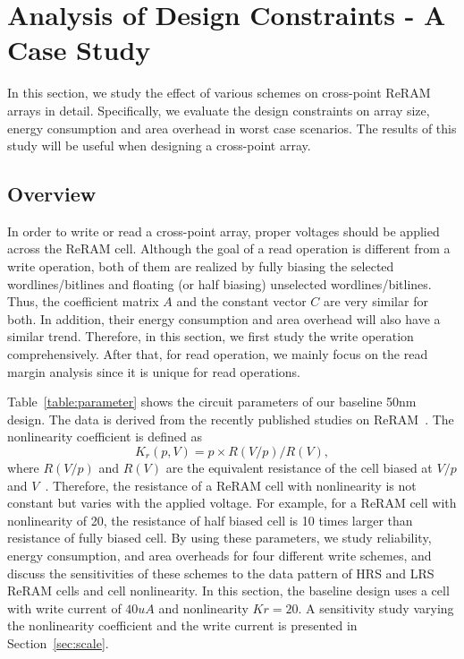 
\section{Analysis of Design Constraints - A Case Study}\label{sec:w_and_r}

In this section, we study the effect of various schemes on cross-point
ReRAM arrays in detail. Specifically, we evaluate the design constraints
on array size, energy consumption and area overhead in worst case
scenarios. The results of this study will be useful when designing a
cross-point array.

\vspace{-5pt}
\subsection{Overview}
In order to write or read a cross-point array, proper voltages should be
applied across the ReRAM cell. Although the goal of a read operation is
different from a write operation, both of them are realized by fully
biasing the selected wordlines/bitlines and floating (or half biasing)
unselected wordlines/bitlines. Thus, the coefficient matrix $A$ and the
constant vector $C$ are very similar for both. In addition, their energy
consumption and area overhead will also have a similar trend. Therefore,
in this section, we first study the write operation comprehensively. After
that, for read operation, we mainly focus on the read margin analysis
since it is unique for read operations.

Table~\ref{table:parameter} shows the circuit parameters of our baseline
50nm design. The data is derived from the recently published studies on
ReRAM~\cite{ReRAM_overview,memristor:Cong,ReRAM_Renesas}. The nonlinearity
coefficient is defined as
\begin{equation}
K_r(p,V) = p \times R(V/p)/R(V),
\end{equation}
where $R(V/p)$ and $R(V)$ are the equivalent resistance of the cell biased
at $V/p$ and $V$~\cite{memristor:Cong}. Therefore, the resistance of a
ReRAM cell with nonlinearity is not constant but varies with the applied
voltage. For example, for a ReRAM cell with nonlinearity of 20, the
resistance of half biased cell is 10 times larger than resistance of fully
biased cell. By using these parameters, we study reliability, energy
consumption, and area overheads for four different write schemes, and
discuss the sensitivities of these schemes to the data pattern of HRS and
LRS ReRAM cells and cell nonlinearity. In this section, the baseline
design uses a cell with write current of $40 uA$ and nonlinearity $Kr=20$.
A sensitivity study varying the nonlinearity coefficient and the write
current is presented in Section~\ref{sec:scale}.

